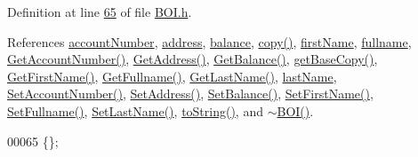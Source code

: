 Definition at line \hyperlink{_b_o_i_8h_source_l00065}{65} of file \hyperlink{_b_o_i_8h_source}{B\+O\+I.\+h}.



References \hyperlink{_b_o_i_8h_source_l00099}{account\+Number}, \hyperlink{_b_o_i_8h_source_l00101}{address}, \hyperlink{_b_o_i_8h_source_l00100}{balance}, \hyperlink{_b_o_i_8cpp_source_l00035}{copy()}, \hyperlink{_b_o_i_8h_source_l00097}{first\+Name}, \hyperlink{_b_o_i_8h_source_l00096}{fullname}, \hyperlink{_b_o_i_8cpp_source_l00073}{Get\+Account\+Number()}, \hyperlink{_b_o_i_8cpp_source_l00057}{Get\+Address()}, \hyperlink{_b_o_i_8cpp_source_l00065}{Get\+Balance()}, \hyperlink{_b_o_i_8cpp_source_l00022}{get\+Base\+Copy()}, \hyperlink{_b_o_i_8cpp_source_l00089}{Get\+First\+Name()}, \hyperlink{_b_o_i_8cpp_source_l00097}{Get\+Fullname()}, \hyperlink{_b_o_i_8cpp_source_l00081}{Get\+Last\+Name()}, \hyperlink{_b_o_i_8h_source_l00098}{last\+Name}, \hyperlink{_b_o_i_8cpp_source_l00069}{Set\+Account\+Number()}, \hyperlink{_b_o_i_8cpp_source_l00053}{Set\+Address()}, \hyperlink{_b_o_i_8cpp_source_l00061}{Set\+Balance()}, \hyperlink{_b_o_i_8cpp_source_l00085}{Set\+First\+Name()}, \hyperlink{_b_o_i_8cpp_source_l00093}{Set\+Fullname()}, \hyperlink{_b_o_i_8cpp_source_l00077}{Set\+Last\+Name()}, \hyperlink{_b_o_i_8cpp_source_l00049}{to\+String()}, and \hyperlink{_b_o_i_8cpp_source_l00012}{$\sim$\+B\+O\+I()}.


\begin{DoxyCode}
00065 \{\};
\end{DoxyCode}


